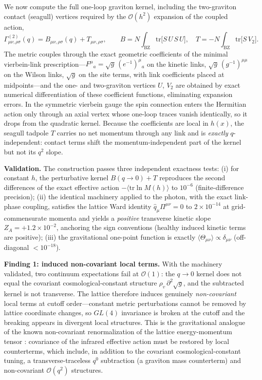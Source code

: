\documentclass[11pt,a4paper]{article}
\begin{document}
We now compute the full one-loop graviton kernel, including the
two-graviton contact (seagull) vertices required by the
$\mathcal{O}(h^2)$ expansion of the coupled action,
\begin{equation}
\Gamma^{(2)}_{\mu\nu,\rho\sigma}(q)
= B_{\mu\nu,\rho\sigma}(q) + T_{\mu\nu,\rho\sigma},
\qquad
B = N\!\int_{\mathrm{BZ}}\!\mathrm{tr}\bigl[S\,U\,S\,U\bigr],
\quad
T = -N\!\int_{\mathrm{BZ}}\!\mathrm{tr}\bigl[S\,V_2\bigr].
\label{eq:fullkernel}
\end{equation}
The metric couples through the exact geometric coefficients of the
minimal vierbein-link prescription---$F^\mu{}_a = \sqrt{g}\,
(e^{-1})^\mu{}_a$ on the kinetic links, $\sqrt{g}\,(g^{-1})^{\mu\mu}$
on the Wilson links, $\sqrt{g}$ on the site terms, with link
coefficients placed at midpoints---and the one- and two-graviton
vertices $U$, $V_2$ are obtained by exact numerical differentiation
of these coefficient functions, eliminating expansion errors.
In the symmetric vierbein gauge the spin connection enters the
Hermitian action only through an axial vertex whose one-loop traces
vanish identically, so it drops from the quadratic kernel.
Because the coefficients are local in $h(x)$, the seagull tadpole
$T$ carries no net momentum through any link and is \emph{exactly}
$q$-independent: contact terms shift the momentum-independent part
of the kernel but not its $q^2$ slope.

\textbf{Validation.}
The construction passes three independent exactness tests:
(i) for constant $h$, the perturbative kernel
$B(q\!\to\!0) + T$ reproduces the second differences of the exact
effective action $-\langle\mathrm{tr}\ln M(h)\rangle$ to
$10^{-6}$ (finite-difference precision);
(ii) the identical machinery applied to the photon, with the exact
link-phase coupling, satisfies the lattice Ward identity
$\hat{q}_\mu\Pi^{\mu\nu} = 0$ to $2\times10^{-14}$ at
grid-commensurate momenta and yields a \emph{positive} transverse
kinetic slope $Z_A = +1.2\times10^{-2}$, anchoring the sign
conventions (healthy induced kinetic terms are positive);
(iii) the gravitational one-point function is exactly
$\langle\Theta_{\mu\nu}\rangle \propto \delta_{\mu\nu}$
(off-diagonal $<10^{-18}$).

\textbf{Finding 1: induced non-covariant local terms.}
With the machinery validated, two continuum expectations fail at
$\mathcal{O}(1)$: the $q\to0$ kernel does not equal the covariant
cosmological-constant structure
$\rho_v\,\partial^2\sqrt{g}$, and the subtracted kernel is not
transverse.
The lattice therefore induces genuinely \emph{non-covariant} local
terms at cutoff order---constant metric perturbations cannot be
removed by lattice coordinate changes, so $GL(4)$ invariance is
broken at the cutoff and the breaking appears in divergent local
structures.
This is the gravitational analogue of the known non-covariant
renormalization of the lattice energy-momentum tensor
\cite{Caracciolo:1989pt}: covariance of the infrared effective
action must be restored by local counterterms, which include, in
addition to the covariant cosmological-constant tuning, a
transverse-traceless $q^0$ subtraction (a graviton mass
counterterm) and non-covariant $\mathcal{O}(q^2)$ structures.
\end{document}
